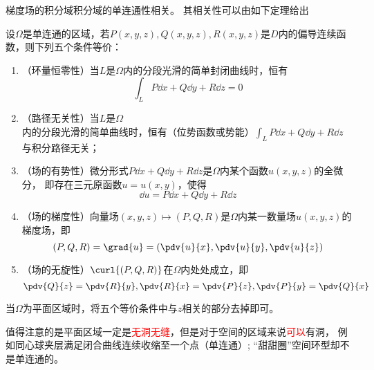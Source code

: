 梯度场的积分域积分域的单连通性相关。
其相关性可以由如下定理给出
\begin{theorem}
    设$\Omega$是单连通的区域，若$P(x,y,z),Q(x,y,z),R(x,y,z)$是$D$内的偏导连续函数，则下列五个条件等价：
    \begin{enumerate}[(1)]
        \item （环量恒零性）当$L$是$\Omega$内的分段光滑的简单封闭曲线时，恒有
              \[ \int_L P\dd{x} + Q\dd{y} + R\dd{z} = 0 \]
        \item （路径无关性）当$L$是$\Omega$内的分段光滑的简单曲线时，恒有（位势函数或势能）$\displaystyle\int_L P\dd{x}+Q\dd{y}+R\dd{z}$
              与积分路径无关；
        \item （场的有势性）微分形式$P\dd{x}+Q\dd{y}+R\dd{z}$是$\Omega$内某个函数$u(x,y,z)$的全微分，
              即存在三元原函数$u=u(x,y)$，使得
              \[ \dd{u} = P\dd{x}+Q\dd{y}+R\dd{z} \]
        \item （场的梯度性）向量场$(x,y,z)\mapsto(P,Q,R)$是$\Omega$内某一数量场$u(x,y,z)$的梯度场，即
              \[ (P,Q,R)=\grad{u}=\left(\pdv{u}{x},\pdv{u}{y},\pdv{u}{z}\right) \]
        \item （场的无旋性）$\curl{(P,Q,R)}$在$\Omega$内处处成立，即
              \[ \pdv{Q}{z} = \pdv{R}{y},\pdv{R}{x}=\pdv{P}{z},\pdv{P}{y}=\pdv{Q}{x} \]
    \end{enumerate}
    当$\Omega$为平面区域时，将五个等价条件中与$z$相关的部分去掉即可。
\end{theorem}
值得注意的是平面区域一定是\textcolor{red}{无洞无缝}，但是对于空间的区域来说\textcolor{red}{可以}有洞，
例如同心球夹层满足闭合曲线连续收缩至一个点（单连通）; “甜甜圈”空间环型却不是单连通的。


